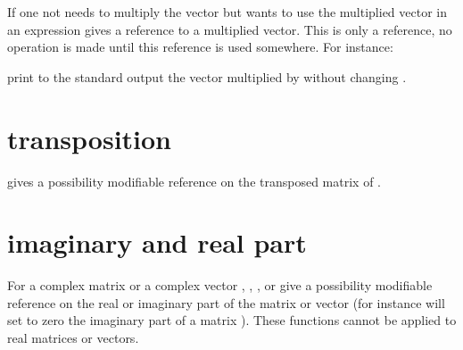\documentclass[a4paper,11pt,english]{sphinxmanual}
\begin{document}
\begin{sphinxVerbatim}[commandchars=\\\{\}]
   
\end{sphinxVerbatim}

\sphinxAtStartPar
If one not needs to multiply the vector but wants to use the multiplied vector in an expression   gives a reference to a multiplied vector. This is only a reference, no operation is made until this reference is used somewhere. For instance:

\begin{sphinxVerbatim}[commandchars=\\\{\}]
     
\end{sphinxVerbatim}

\sphinxAtStartPar
print to the standard output the vector  multiplied by  without changing .


\section{transposition}
\label{\detokenize{gmm/blas:transposition}}
\sphinxAtStartPar
{} gives a possibility modifiable reference on the transposed matrix of .


\section{imaginary and real part}
\label{\detokenize{gmm/blas:imaginary-and-real-part}}
\sphinxAtStartPar
For a complex matrix  or a complex vector ,
, ,  or  give a possibility modifiable reference on the real or imaginary part of the matrix or vector (for instance  will set to zero the imaginary part of a matrix ). These functions cannot be applied to real matrices or vectors.
\end{document}

